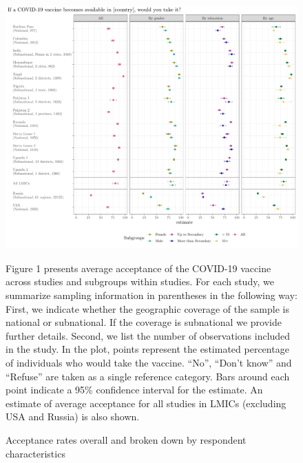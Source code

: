 \documentclass[
  12pt,
]{article}
\begin{document}
\begin{landscape}
\begin{table}[!h]
{\begin{threeparttable}
\begin{tablenotes}
\end{tablenotes}
\end{threeparttable}}
\end{table}
\end{landscape}

\begin{figure}[!ht]
\caption{Acceptance rates overall and broken down by respondent characteristics \label{fig:mainfigure1}}

\includegraphics{paper_files/figure-latex/mainfigure1-1.pdf}

\scriptsize{Figure 1 presents average acceptance of the COVID-19 vaccine across studies and subgroups within studies. For each study, we summarize sampling information in parentheses in the following way: First, we indicate whether the geographic coverage of the sample is national or subnational. If the coverage is subnational we provide further details. Second, we list the number of observations included in the study. In the plot, points represent the estimated percentage of individuals who would take the vaccine. ``No'', ``Don't know'' and ``Refuse'' are taken as a single reference category. Bars around each point indicate a 95\% confidence interval for the estimate. An estimate of average acceptance for all studies in LMICs (excluding USA and Russia) is also shown.}
\end{figure}
\end{document}
